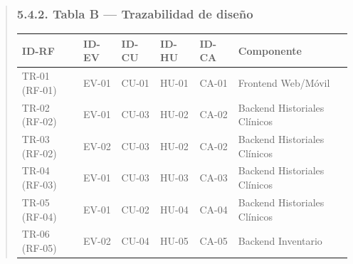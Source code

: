 \documentclass[
]{article}
\newcounter{none} %
\begin{document}
\begin{quote}
\subsubsection{5.4.2. Tabla B --- Trazabilidad de diseño}\label{matriz-extendida-tabla-b}

{\def\LTcaptype{none} %
\begin{longtable}[]{|
  >{\centering\arraybackslash}p{}|
  >{\centering\arraybackslash}p{}|
  >{\centering\arraybackslash}p{}|
  >{\centering\arraybackslash}p{}|
  >{\centering\arraybackslash}p{}|
  >{\raggedright\arraybackslash}p{}|}
\hline
\begin{minipage}[b]{\linewidth}\centering
\textbf{ID-RF}
\end{minipage} & \begin{minipage}[b]{\linewidth}\centering
\textbf{ID-EV}
\end{minipage} & \begin{minipage}[b]{\linewidth}\centering
\textbf{ID-CU}
\end{minipage} & \begin{minipage}[b]{\linewidth}\centering
\textbf{ID-HU}
\end{minipage} & \begin{minipage}[b]{\linewidth}\centering
\textbf{ID-CA}
\end{minipage} & \begin{minipage}[b]{\linewidth}\raggedright
\textbf{Componente}
\end{minipage} \\
\hline
\endhead
\hline
\endlastfoot
TR-01 (RF-01) & EV-01 & CU-01 & HU-01 & CA-01 & Frontend Web/Móvil \\
\hline
TR-02 (RF-02) & EV-01 & CU-03 & HU-02 & CA-02 & Backend Historiales Clínicos \\
\hline
TR-03 (RF-02) & EV-02 & CU-03 & HU-02 & CA-02 & Backend Historiales Clínicos \\
\hline
TR-04 (RF-03) & EV-01 & CU-03 & HU-03 & CA-03 & Backend Historiales Clínicos \\
\hline
TR-05 (RF-04) & EV-01 & CU-02 & HU-04 & CA-04 & Backend Historiales Clínicos \\
\hline
TR-06 (RF-05) & EV-02 & CU-04 & HU-05 & CA-05 & Backend Inventario \\

\end{longtable}}
\end{quote}
\end{document}
